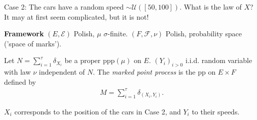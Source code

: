 Case 2: The cars have a random speed $ \sim \mathcal{U}([50,100]) $. What is the law of $X$? It may at first seem complicated, but it is not!

\noindent
\textbf{Framework} $(E, \mathcal{E})$ Polish, $\mu$ $\sigma$-finite. $(F, \mathcal{F}, \nu )$ Polish, probability space ('space of marks').
\begin{defn}
	Let $N=\sum_{i=1}^{\tau} \delta_{X_i}$ be a proper ppp$(\mu)$ on $E$. $(Y_i)_{i> 0}$ i.i.d. random variable with law $\nu $ independent of $N$. The \emph{marked point process} is the pp on $E \times F$ defined by 
	\begin{align}
	\boxed{M=\sum_{i=1}^{\tau} \delta_{(X_i, Y_i)}.}
	\end{align}
\end{defn}

\begin{rmk}[]
	$X_i$ corresponds to the position of the cars in Case 2, and $Y_i$ to their speeds.
\end{rmk}

